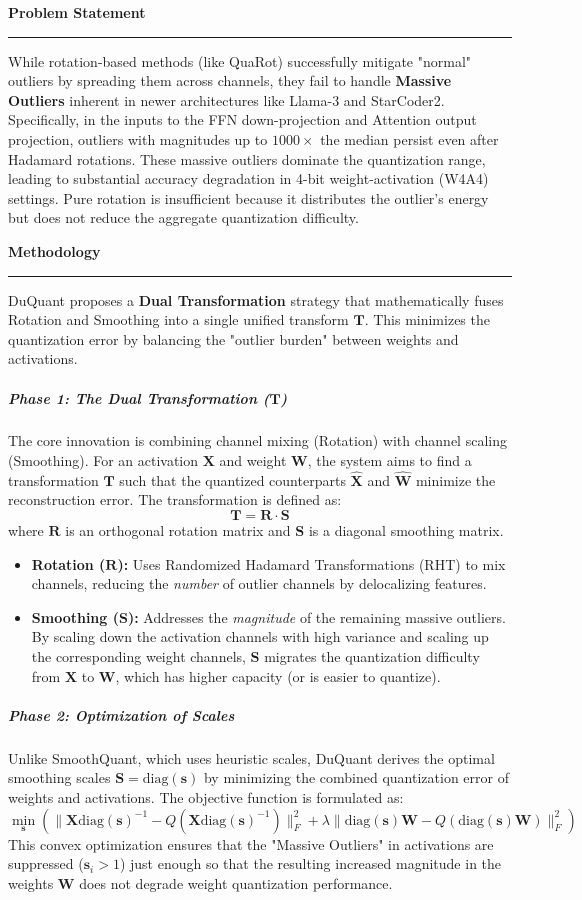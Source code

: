 \documentclass[11pt,a4paper]{article}
\newcommand{\problemp}[1]{%
  \par\medskip
  {\noindent\bfseries\normalsize\color{signcol}#1\par}%
  \vspace{0.4ex}%
  {\noindent\color{softgray}\rule{\linewidth}{0.6pt}\par}%
  \vspace{0.8ex}%
}
\theoremstyle{definition}
\begin{document}
\problemp{Problem Statement}
While rotation-based methods (like QuaRot) successfully mitigate "normal" outliers by spreading them across channels, they fail to handle \textbf{Massive Outliers} inherent in newer architectures like Llama-3 and StarCoder2.
Specifically, in the inputs to the FFN down-projection and Attention output projection, outliers with magnitudes up to $1000\times$ the median persist even after Hadamard rotations. These massive outliers dominate the quantization range, leading to substantial accuracy degradation in 4-bit weight-activation (W4A4) settings. Pure rotation is insufficient because it distributes the outlier's energy but does not reduce the aggregate quantization difficulty.

\vspace{1cm}
\problemp{Methodology}
DuQuant proposes a \textbf{Dual Transformation} strategy that mathematically fuses Rotation and Smoothing into a single unified transform $\bm{T}$. This minimizes the quantization error by balancing the "outlier burden" between weights and activations.

\subparagraph{Phase 1: The Dual Transformation ($\bm{T}$)}
The core innovation is combining channel mixing (Rotation) with channel scaling (Smoothing). For an activation $\bm{X}$ and weight $\bm{W}$, the system aims to find a transformation $\bm{T}$ such that the quantized counterparts $\hat{\bm{X}}$ and $\hat{\bm{W}}$ minimize the reconstruction error. The transformation is defined as:
\begin{equation}
  \bm{T} = \bm{R} \cdot \bm{S}
\end{equation}
where $\bm{R}$ is an orthogonal rotation matrix and $\bm{S}$ is a diagonal smoothing matrix.
\begin{itemize}
  \item \textbf{Rotation ($\bm{R}$):} Uses Randomized Hadamard Transformations (RHT) to mix channels, reducing the \textit{number} of outlier channels by delocalizing features.
  \item \textbf{Smoothing ($\bm{S}$):} Addresses the \textit{magnitude} of the remaining massive outliers. By scaling down the activation channels with high variance and scaling up the corresponding weight channels, $\bm{S}$ migrates the quantization difficulty from $\bm{X}$ to $\bm{W}$, which has higher capacity (or is easier to quantize).
\end{itemize}

\subparagraph{Phase 2: Optimization of Scales}
Unlike SmoothQuant, which uses heuristic scales, DuQuant derives the optimal smoothing scales $\bm{S} = \text{diag}(\bm{s})$ by minimizing the combined quantization error of weights and activations. The objective function is formulated as:
\begin{equation}
  \min_{\bm{s}} \left( \|\bm{X}\text{diag}(\bm{s})^{-1} - Q(\bm{X}\text{diag}(\bm{s})^{-1})\|_F^2 + \lambda \|\text{diag}(\bm{s})\bm{W} - Q(\text{diag}(\bm{s})\bm{W})\|_F^2 \right)
\end{equation}
This convex optimization ensures that the "Massive Outliers" in activations are suppressed ($\bm{s}_i > 1$) just enough so that the resulting increased magnitude in the weights $\bm{W}$ does not degrade weight quantization performance.
\end{document}
